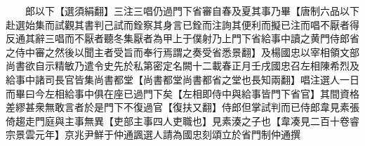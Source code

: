 　　郎以下【選須絹翻】三注三唱仍過門下省審自春及夏其事乃畢【唐制六品以下赴選始集而試觀其書判己試而銓察其身言已銓而注詢其便利而擬已注而唱不厭者得反通其辭三唱而不厭者聽冬集厭者為甲上于僕射乃上門下省給事中讀之黄門侍郎省之侍中審之然後以聞主者受旨而奉行焉謂之奏受省悉景翻】及楊國忠以宰相領文部尚書欲自示精敏乃遣令史先於私第密定名闕十二載春正月壬戌國忠召左相陳希烈及給事中諸司長官皆集尚書都堂【尚書都堂尚書都省之堂也長知兩翻】唱注選人一日而畢曰今左相給事中俱在座已過門下矣【左相即侍中與給事皆門下省官】其間資格差繆甚衆無敢言者於是門下不復過官【復扶又翻】侍郎但掌試判而已侍郎韋見素張倚趨走門庭與主事無異【吏部主事四人吏職也】見素湊之子也【韋凑見二百十卷睿宗景雲元年】京兆尹鮮于仲通諷選人請為國忠刻頌立於省門制仲通撰
